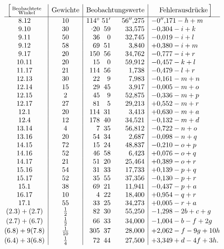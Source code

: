 \[
\begin{array}{@{}c|c|r@{\;}r@{\;}r|l@{}}
 \Bigl[\,\substack{\text{Beobachtete}\\\text{Winkel}}&
 \text{Gewichte}&\multicolumn{3}{c|}{\text{Beobachtungswerte}}&
 \multicolumn{1}{c@{}}{\text{Fehlerausdrücke}\,\Bigr]}\\
 \hline
 8.12&10&114^\circ&51'&56''{,}275&-0''{,}171-h+m\\
 9.10&30&\mathord{\raisebox{.55ex}{.}}20&59&33{,}575&-0{,}304-i+k\\
 9.11&50&36&0&32{,}745&-0{,}019-i+l\\
 9.12&58&69&51&3{,}840&+0{,}380-i+m\\
 9.17&20&150&56&34{,}762&-0{,}777-i+r\\
 10.11&20&15&0&59{,}912&-0{,}457-k+l\\
 11.17&21&114&56&1{,}738&-0{,}479-l+r\\
 12.13&30&22&9&7{,}983&-0{,}161-m+n\\
 12.14&15&29&45&3{,}917&-0{,}005-m+o\\
 12.15&2&45&9&52{,}875&-0{,}336-m+p\\
 12.17&27&81&5&29{,}213&+0{,}552-m+r\\
 12.1&20&114&31&3{,}413&+0{,}630-m+a\\
 12.4&12&178&40&34{,}521&-0{,}132-m+d\\
 13.14&4&7&35&56{,}812&-0{,}722-n+o\\
 13.16&20&54&34&2{,}687&-0{,}098-n+q\\
 14.15&72&15&24&48{,}837&-0{,}210-o+p\\
 14.16&52&46&58&6{,}423&+0{,}076-o+q\\
 14.17&21&51&20&25{,}464&+0{,}389-o+r\\
 15.16&54&31&33&17{,}733&+0{,}139-p+q\\
 15.17&52&35&55&37{,}356&-0{,}130-p+r\\
 15.1&38&69&21&11{,}941&-0{,}437-p+a\\
 16.17&10&4&22&18{,}400&+0{,}954-q+r\\
 17.1&55&33&25&34{,}273&+0{,}005-r+a\\
 (2.3)+(2.7)&\frac12&82&30&55{,}250&-1{,}298-2b+c+g\\[2pt]
 (2.7)+(6.7)&\frac12&66&33&34{,}000&-1{,}004-b-f+2g\\[2pt]
 (6.8)+9(7.8)&\frac{1}{10}&305&37&28{,}000&+2{,}062-f-9g+10h\\[2pt]
 (6.4)+3(6.8)&\frac14&72&44&27{,}500&+3{,}349+d-4f+3h.
\end{array}
\]

